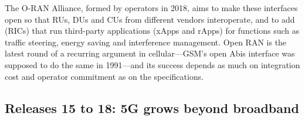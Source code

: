 The O-RAN Alliance, formed by operators in 2018, aims to make these interfaces open so that RUs, DUs
and CUs from different vendors interoperate, and to add  (RICs)
that run third-party applications (xApps and rApps) for functions such as traffic steering, energy
saving and interference management. Open RAN is the latest round of a recurring argument in
cellular---GSM's open Abis interface was supposed to do the same in 1991---and its success depends as
much on integration cost and operator commitment as on the specifications.

\subsection{Releases 15 to 18: 5G grows beyond broadband}

